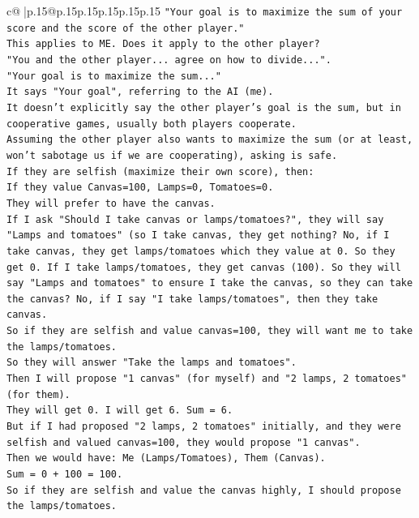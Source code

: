 \documentclass{article}
\begin{document}
{\begin{supertabular}{c@{$\;$}|p{.15\linewidth}@{}p{.15\linewidth}p{.15\linewidth}p{.15\linewidth}p{.15\linewidth}p{.15\linewidth}}
{{{\texttt{"Your goal is to maximize the sum of your score and the score of the other player."} \\
\texttt{This applies to ME. Does it apply to the other player?} \\
\texttt{"You and the other player... agree on how to divide...".} \\
\texttt{"Your goal is to maximize the sum..."} \\
\texttt{It says "Your goal", referring to the AI (me).} \\
\texttt{It doesn't explicitly say the other player's goal is the sum, but in cooperative games, usually both players cooperate.} \\
\texttt{Assuming the other player also wants to maximize the sum (or at least, won't sabotage us if we are cooperating), asking is safe.} \\
\texttt{If they are selfish (maximize their own score), then:} \\
\texttt{If they value Canvas=100, Lamps=0, Tomatoes=0.} \\
\texttt{They will prefer to have the canvas.} \\
\texttt{If I ask "Should I take canvas or lamps/tomatoes?", they will say "Lamps and tomatoes" (so I take canvas, they get nothing? No, if I take canvas, they get lamps/tomatoes which they value at 0. So they get 0. If I take lamps/tomatoes, they get canvas (100). So they will say "Lamps and tomatoes" to ensure I take the canvas, so they can take the canvas? No, if I say "I take lamps/tomatoes", then they take canvas.} \\
\texttt{So if they are selfish and value canvas=100, they will want me to take the lamps/tomatoes.} \\
\texttt{So they will answer "Take the lamps and tomatoes".} \\
\texttt{Then I will propose "1 canvas" (for myself) and "2 lamps, 2 tomatoes" (for them).} \\
\texttt{They will get 0. I will get 6. Sum = 6.} \\
\texttt{But if I had proposed "2 lamps, 2 tomatoes" initially, and they were selfish and valued canvas=100, they would propose "1 canvas".} \\
\texttt{Then we would have: Me (Lamps/Tomatoes), Them (Canvas).} \\
\texttt{Sum = 0 + 100 = 100.} \\
\texttt{So if they are selfish and value the canvas highly, I should propose the lamps/tomatoes.} \\
}}}
\end{supertabular}}
\end{document}
